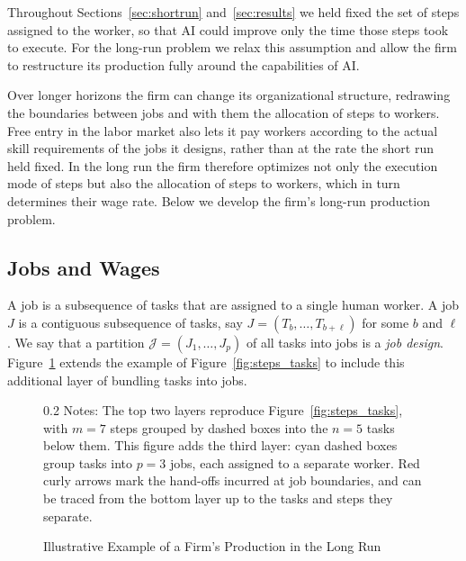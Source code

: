 Throughout Sections~\ref{sec:shortrun} and~\ref{sec:results} we held fixed the set of steps assigned to the worker, so that AI could improve only the time those steps took to execute.
For the long-run problem we relax this assumption and allow the firm to restructure its production fully around the capabilities of AI.

Over longer horizons the firm can change its organizational structure, redrawing the boundaries between jobs and with them the allocation of steps to workers.
Free entry in the labor market also lets it pay workers according to the actual skill requirements of the jobs it designs, rather than at the rate the short run held fixed.
In the long run the firm therefore optimizes not only the execution mode of steps but also the allocation of steps to workers, which in turn determines their wage rate.
Below we develop the firm's long-run production problem.

\subsection{Jobs and Wages}
\label{sec:longrun.jobdesign}

A job is a subsequence of tasks that are assigned to a single human worker.
A job $J$ is a contiguous subsequence of tasks, say $J = (T_b, \dotsc, T_{b+\ell})$ for some $b$ and $\ell$.
We say that a partition $\mathcal{J} = (J_1, \dotsc, J_p)$ of all tasks into jobs is a \emph{job design}.
Figure~\ref{fig:hierarchical_production} extends the example of Figure~\ref{fig:steps_tasks} to include this additional layer of bundling tasks into jobs.

\begin{figure}[!t]
  \centering
  \caption{Illustrative Example of a Firm's Production in the Long Run}
  \label{fig:hierarchical_production}
  

  \par\vspace{\fignotesskip}
\begin{minipage}{1\linewidth}
\begin{spacing}{0.2}
{\fontsize{9.5pt}{10pt}\selectfont Notes: The top two layers reproduce Figure~\ref{fig:steps_tasks}, with $m=7$ steps grouped by dashed boxes into the $n=5$ tasks below them.
This figure adds the third layer: cyan dashed boxes group tasks into $p=3$ jobs, each assigned to a separate worker.
Red curly arrows mark the hand-offs incurred at job boundaries, and can be traced from the bottom layer up to the tasks and steps they separate.}
\end{spacing}
\end{minipage}
\end{figure}


